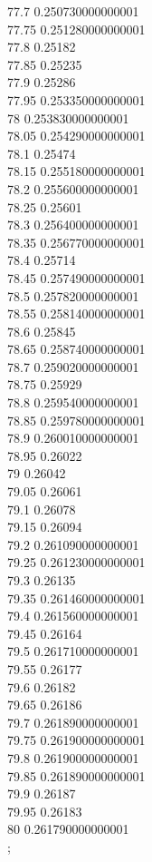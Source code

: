 {77.7	0.250730000000001\\
77.75	0.251280000000001\\
77.8	0.25182\\
77.85	0.25235\\
77.9	0.25286\\
77.95	0.253350000000001\\
78	0.253830000000001\\
78.05	0.254290000000001\\
78.1	0.25474\\
78.15	0.255180000000001\\
78.2	0.255600000000001\\
78.25	0.25601\\
78.3	0.256400000000001\\
78.35	0.256770000000001\\
78.4	0.25714\\
78.45	0.257490000000001\\
78.5	0.257820000000001\\
78.55	0.258140000000001\\
78.6	0.25845\\
78.65	0.258740000000001\\
78.7	0.259020000000001\\
78.75	0.25929\\
78.8	0.259540000000001\\
78.85	0.259780000000001\\
78.9	0.260010000000001\\
78.95	0.26022\\
79	0.26042\\
79.05	0.26061\\
79.1	0.26078\\
79.15	0.26094\\
79.2	0.261090000000001\\
79.25	0.261230000000001\\
79.3	0.26135\\
79.35	0.261460000000001\\
79.4	0.261560000000001\\
79.45	0.26164\\
79.5	0.261710000000001\\
79.55	0.26177\\
79.6	0.26182\\
79.65	0.26186\\
79.7	0.261890000000001\\
79.75	0.261900000000001\\
79.8	0.261900000000001\\
79.85	0.261890000000001\\
79.9	0.26187\\
79.95	0.26183\\
80	0.261790000000001\\
};
